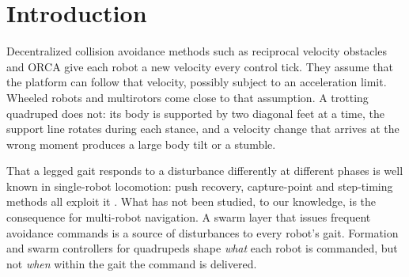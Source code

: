 
\section{Introduction}\label{sec:intro}

Decentralized collision avoidance methods such as reciprocal velocity obstacles and ORCA
\cite{vandenberg2008rvo,vandenberg2011orca} give each robot a new velocity every control tick. They assume
that the platform can follow that velocity, possibly subject to an acceleration limit. Wheeled robots and
multirotors come close to that assumption. A trotting quadruped does not: its body is supported by two
diagonal feet at a time, the support line rotates during each stance, and a velocity change that arrives
at the wrong moment produces a large body tilt or a stumble.

That a legged gait responds to a disturbance differently at different phases is well known in
single-robot locomotion: push recovery, capture-point and step-timing methods all exploit it
\cite{pratt2006capture,khadiv2016step,chen2022capturability,hobbelen2007gsn}. What has not been studied,
to our knowledge, is the consequence for multi-robot navigation. A swarm layer that issues frequent
avoidance commands is a source of disturbances to every robot's gait. Formation and swarm controllers for
quadrupeds \cite{zhan2025safe,noren2026role} shape \emph{what} each robot is commanded, but not \emph{when}
within the gait the command is delivered.

